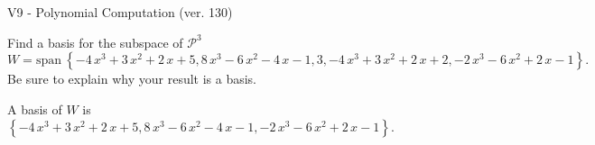 \begin{exercise}
  \begin{exerciseTitle}V9 - Polynomial Computation (ver. 130)\end{exerciseTitle}
  \begin{exerciseStatement}
    Find a basis for the subspace of \(\mathcal{P}^3\) 
\[W=\mathrm{span}\ \left\{-4 \, x^{3} + 3 \, x^{2} + 2 \, x + 5 , 8 \, x^{3} - 6 \, x^{2} - 4 \, x - 1 , 3 , -4 \, x^{3} + 3 \, x^{2} + 2 \, x + 2 , -2 \, x^{3} - 6 \, x^{2} + 2 \, x - 1\right\}.\]
 Be sure to explain why your result is a basis.


  \end{exerciseStatement}
  \begin{exerciseAnswer}
   A basis of \(W\) is  \(\left\{-4 \, x^{3} + 3 \, x^{2} + 2 \, x + 5 , 8 \, x^{3} - 6 \, x^{2} - 4 \, x - 1 , -2 \, x^{3} - 6 \, x^{2} + 2 \, x - 1\right\}\).
  


  \end{exerciseAnswer}
\end{exercise}
